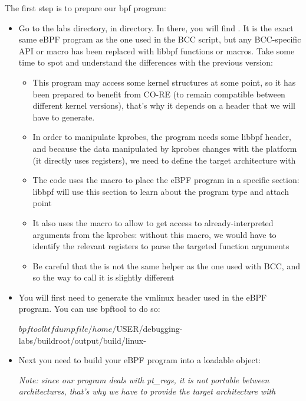 The first step is to prepare our bpf program:
\begin{itemize}
  \item Go to the labs directory, in  directory. In there, you will find . It is the exact same eBPF program as the one used in the BCC script, but any BCC-specific API or macro has been replaced with libbpf functions or macros. Take some time to spot and understand the differences with the previous version:
    \begin{itemize}
      \item This program may access some kernel structures at some point, so it has been prepared to benefit from CO-RE (to remain compatible between different kernel versions), that's why it depends on a  header that we will have to generate.
      \item In order to manipulate kprobes, the program needs some libbpf header, and because the data manipulated by kprobes changes with the platform (it directly uses registers), we need to define the target architecture with 
      \item The code uses the  macro to place the eBPF program in a specific section: libbpf will use this section to learn about the program type and attach point
      \item It also uses the  macro to allow to get access to already-interpreted arguments from the kprobes: without this macro, we would have to identify the relevant registers to parse the targeted function arguments
      \item Be careful that the  is not the same helper as the one used with BCC, and so the way to call it is slightly different
    \end{itemize}
  \item You will first need to generate the vmlinux header used in the eBPF program. You can use bpftool to do so:
  \begin{bashinput}
$ bpftool btf dump file /home/${USER}/debugging-labs/buildroot/output/build/linux-%
  \end{bashinput}
  \item Next you need to build your eBPF program into a loadable object:
{\em Note: since our program deals with pt\_regs, it is not portable between architectures, that's why we have to provide the target architecture with }
\end{itemize}

